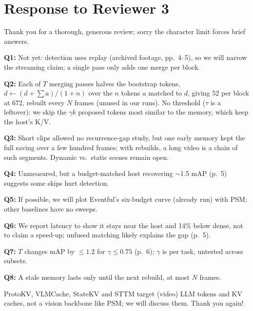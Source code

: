 \section*{Response to Reviewer 3}

Thank you for a thorough, generous review; sorry the character limit forces brief answers.

\textbf{Q1:} Not yet: detection uses replay (archived footage, pp.~4--5), so we will narrow the streaming claim; a single pass only adds one merge per block.

\textbf{Q2:} Each of $T$ merging passes halves the bootstrap tokens, $d \leftarrow (d + \sum a)/(1 + n)$ over the $n$ tokens $a$ matched to $d$, giving 52 per block at 672, rebuilt every $N$ frames (unused in our runs). No threshold ($\tau$ is a leftover): we skip the $\gamma k$ proposed tokens most similar to the memory, which keep the host's K/V.

\textbf{Q3:} Short clips allowed no recurrence-gap study, but one early memory kept the full saving over a few hundred frames; with rebuilds, a long video is a chain of such segments. Dynamic vs.\ static scenes remain open.

\textbf{Q4:} Unmeasured, but a budget-matched host recovering $\sim$1.5 mAP (p.~5) suggests some skips hurt detection.

\textbf{Q5:} If possible, we will plot Eventful's six-budget curve (already run) with PSM; other baselines have no sweeps.

\textbf{Q6:} We report latency to show it stays near the host and 14\% below dense, not to claim a speed-up; unfused matching likely explains the gap (p.~5).

\textbf{Q7:} $T$ changes mAP by $\le 1.2$ for $\gamma \le 0.75$ (p.~6); $\gamma$ is per task, untested across subsets.

\textbf{Q8:} A stale memory lasts only until the next rebuild, at most $N$ frames.

ProtoKV, VLMCache, StateKV and STTM target (video) LLM tokens and KV caches, not a vision backbone like PSM; we will discuss them. Thank you again!
